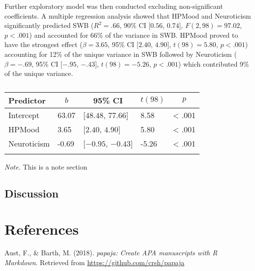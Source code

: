 \documentclass[man,floatsintext]{apa6}
\begin{document}
Further exploratory model was then conducted excluding non-significant
coefficients. A multiple regression analysis showed that HPMood and
Neuroticism significantly predicted SWB (\(R^2 = .66\), 90\% CI
\([0.56\), \(0.74]\), \(F(2, 98) = 97.02\), \(p < .001\)) and accounted
for 66\% of the variance in SWB. HPMood proved to have the strongest
effect (\(\beta = 3.65\), 95\% CI \([2.40\), \(4.90]\),
\(t(98) = 5.80\), \(p < .001\)) accounting for 12\% of the unique
variance in SWB followed by Neuroticism (\(\beta = -.69\), 95\% CI
\([-.95\), \(-.43]\), \(t(98) = -5.26\), \(p < .001\)) which contributed
9\% of the unique variance.

\begin{table}[tbp]
\begin{center}
\begin{threeparttable}
\caption{\label{tab:unnamed-chunk-3}}
\small{
\begin{tabular}{lllll}
\toprule
Predictor & \multicolumn{1}{c}{$b$} & \multicolumn{1}{c}{95\% CI} & \multicolumn{1}{c}{$t(98)$} & \multicolumn{1}{c}{$p$}\\
\midrule
Intercept & 63.07 & $[48.48$, $77.66]$ & 8.58 & < .001\\
HPMood & 3.65 & $[2.40$, $4.90]$ & 5.80 & < .001\\
Neuroticism & -0.69 & $[-0.95$, $-0.43]$ & -5.26 & < .001\\
\bottomrule
\addlinespace
\end{tabular}
}
\begin{tablenotes}[para]
\normalsize{\textit{Note.} This is a note section}
\end{tablenotes}
\end{threeparttable}
\end{center}
\end{table}

\subsection{Discussion}\label{discussion}

\newpage

\section{References}\label{references}

\begingroup
\setlength{\parindent}{-0.5in} \setlength{\leftskip}{0.5in}

\hypertarget{refs}{}
\hypertarget{ref-R-papaja}{}
Aust, F., \& Barth, M. (2018). \emph{papaja: Create APA manuscripts with
R Markdown}. Retrieved from \url{https://github.com/crsh/papaja}
\end{document}
